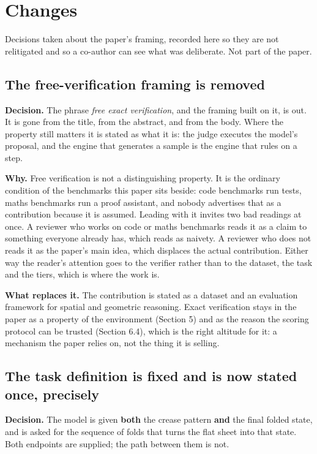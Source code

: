 \section{Changes}
\label{app:changes}

Decisions taken about the paper's framing, recorded here so they are not relitigated and so a
co-author can see what was deliberate. Not part of the paper.

\subsection{The free-verification framing is removed}

\textbf{Decision.} The phrase \emph{free exact verification}, and the framing built on it, is out.
It is gone from the title, from the abstract, and from the body. Where the property still matters
it is stated as what it is: the judge executes the model's proposal, and the engine that generates
a sample is the engine that rules on a step.

\textbf{Why.} Free verification is not a distinguishing property. It is the ordinary condition of
the benchmarks this paper sits beside: code benchmarks run tests, maths benchmarks run a proof
assistant, and nobody advertises that as a contribution because it is assumed. Leading with it
invites two bad readings at once. A reviewer who works on code or maths benchmarks reads it as a
claim to something everyone already has, which reads as naivety. A reviewer who does not reads it
as the paper's main idea, which displaces the actual contribution. Either way the reader's
attention goes to the verifier rather than to the dataset, the task and the tiers, which is where
the work is.

\textbf{What replaces it.} The contribution is stated as a dataset and an evaluation framework for
spatial and geometric reasoning. Exact verification stays in the paper as a property of the
environment (Section 5) and as the reason the scoring protocol can be trusted (Section 6.4), which
is the right altitude for it: a mechanism the paper relies on, not the thing it is selling.

\subsection{The task definition is fixed and is now stated once, precisely}

\textbf{Decision.} The model is given \textbf{both} the crease pattern \textbf{and} the final
folded state, and is asked for the sequence of folds that turns the flat sheet into that state.
Both endpoints are supplied; the path between them is not.

